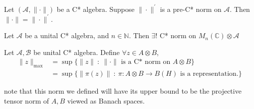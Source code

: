 \begin{theorem}
  Let $(\mathcal{A}, \|\cdot\|)$ be a C* algebra. Suppose $
  \|\cdot\|^\prime$ is a pre-C* norm on $ \mathcal{A}$. Then $\|\cdot\|
  = \|\cdot\|^\prime$.
\end{theorem}

\begin{example}
  Let $\mathcal{A}$ be a unital C* algebra, and $n \in \mathbb{N}$.
  Then $\exists!$ C* norm on $M_n(\mathbb{C}) \otimes \mathcal{A}$
\end{example}

\begin{definition}
  Let $\mathcal{A}, \mathcal{B}$ be unital C* algebra. Define
  $\forall z \in A \otimes B$,
  \begin{align*}
    \|z\|_{\textrm{max}} &= \sup\{ \|z\| \ : \ \|\cdot\| \textrm{ is a
    C* norm on } A \otimes B\} \\
    &= \sup \{ \|\pi(z)\| \ : \ \pi: A \otimes B \to B(H) \textrm{ is
    a representation.}  \}
  \end{align*}
\end{definition}
note that this norm we defined will have its upper bound to be the
projective tensor norm of $A, B$ viewed as Banach spaces.
